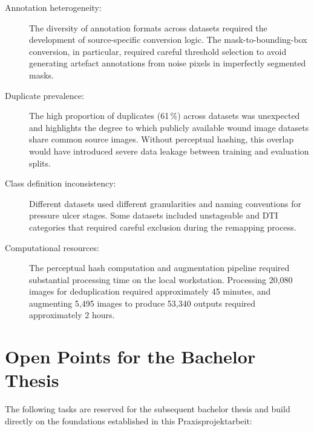 \documentclass[a4paper,12pt,twoside]{report}
\begin{document}
\begin{description}
  \item[Annotation heterogeneity:] The diversity of annotation formats across
    datasets required the development of source-specific conversion logic. The
    mask-to-bounding-box conversion, in particular, required careful threshold
    selection to avoid generating artefact annotations from noise pixels in
    imperfectly segmented masks.

  \item[Duplicate prevalence:] The high proportion of duplicates (61\,\%) across
    datasets was unexpected and highlights the degree to which publicly available
    wound image datasets share common source images. Without perceptual hashing,
    this overlap would have introduced severe data leakage between training and
    evaluation splits.

  \item[Class definition inconsistency:] Different datasets used different
    granularities and naming conventions for pressure ulcer stages. Some datasets
    included unstageable and DTI categories that required careful exclusion during
    the remapping process.

  \item[Computational resources:] The perceptual hash computation and
    augmentation pipeline required substantial processing time on the local
    workstation. Processing 20,080 images for deduplication required approximately
    45 minutes, and augmenting 5,495 images to produce 53,340 outputs required
    approximately 2 hours.
\end{description}

\section{Open Points for the Bachelor Thesis}
\label{sec:outlook}

The following tasks are reserved for the subsequent bachelor thesis and build
directly on the foundations established in this Praxisprojektarbeit:
\end{document}
